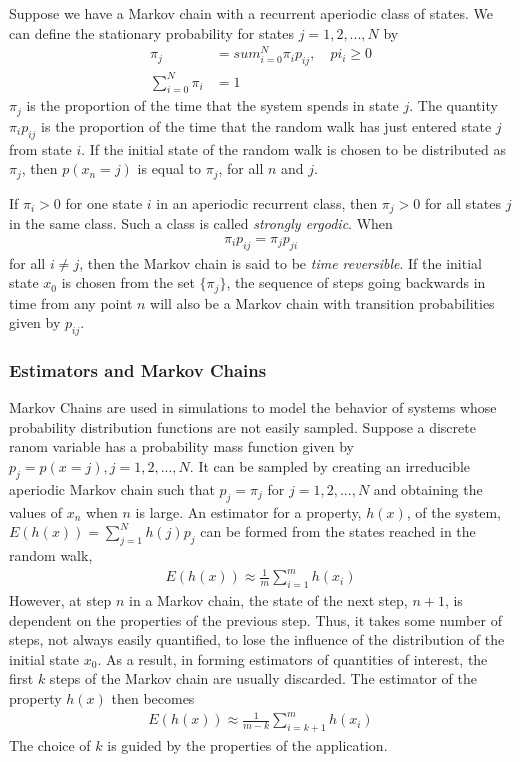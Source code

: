 \documentclass[twoside,english]{uiofysmaster}
\begin{document}
Suppose we have a Markov chain with a recurrent aperiodic class of states. We can define the stationary probability for states $j=1,2,...,N$ by
\begin{align}
	\pi_j &= sum_{i=0}^N \pi_i p_{ij}, \quad pi_i \geq 0 \\
	\sum_{i=0}^N \pi_i &= 1
\end{align}
$\pi_j$ is the proportion of the time that the system spends in state $j$. The quantity $\pi_i p_{ij}$ is the proportion of the time that the random walk has just entered state $j$ from state $i$. If the initial state of the random walk is chosen to be distributed as $\pi_j$, then $p(x_n=j)$ is equal to $\pi_j$, for all $n$ and $j$. 

If $\pi_i > 0$ for one state $i$ in an aperiodic recurrent class, then $\pi_j > 0$ for all states $j$ in the same class. Such a class is called \textit{strongly ergodic}. When
\begin{align}
	\pi_i p_{ij} = \pi_j p_{ji}
\end{align}
for all $i\neq j$, then the Markov chain is said to be \textit{time reversible}. If the initial state $x_0$ is chosen from the set $\{ \pi_j \}$, the sequence of steps going backwards in time from any point $n$ will also be a Markov chain with transition probabilities given by $p_{ij}$. 

\subsubsection{Estimators and Markov Chains}
Markov Chains are used in simulations to model the behavior of systems whose probability distribution functions are not easily sampled. Suppose a discrete ranom variable has a probability mass function given by $p_j = p(x=j), j=1,2,..., N$. It can be sampled by creating an irreducible aperiodic Markov chain such that $p_j = \pi_j$ for $j=1,2,...,N$ and obtaining the values of $x_n$ when $n$ is large. An estimator for a property, $h(x)$, of the system, $E(h(x)) = \sum_{j=1}^N h(j) p_j$ can be formed from the states reached in the random walk,
\begin{align}
	E(h(x)) \approx \frac{1}{m} \sum_{i=1}^m h(x_i)
\end{align}
However, at step $n$ in a Markov chain, the state of the next step, $n+1$, is dependent on the properties of the previous step. Thus, it takes some number of steps, not always easily quantified, to lose the influence of the distribution of the initial state $x_0$. As a result, in forming estimators of quantities of interest, the first $k$ steps of the Markov chain are usually discarded. The estimator of the property $h(x)$ then becomes
\begin{align}
	E(h(x)) \approx \frac{1}{m-k} \sum_{i=k+1}^m h(x_i)
\end{align}
The choice of $k$ is guided by the properties of the application. 
\end{document}

